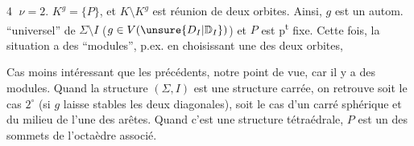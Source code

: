 \textcircled{4} \(\nu=2\).   \(K^g=\{P\}\), et \(K\setminus K^g\)  est réunion de deux orbites. Ainsi, \(g\) est un autom.  ``universel'' de \(\Sigma\setminus I\) (\(g\in V(\unsure{D_I|\mathbb D_I})\)) et \(P\) est   p\textsuperscript{t} fixe.  Cette fois, la situation a des ``modules'', p.ex. en choisissant une des deux orbites,


Cas moins intéressant que les précédents,  notre point de vue, car il y a des modules. Quand la structure \((\Sigma,I)\) est une structure carrée, on retrouve soit le cas \(2^\circ\) (si \(g\) laisse stables les deux diagonales), soit le cas  d’un  carré sphérique \unsure{,} et du milieu de l’une des arêtes.  Quand c’est une structure tétraédrale, \(P\) est un des  sommets de l’octaèdre associé.

